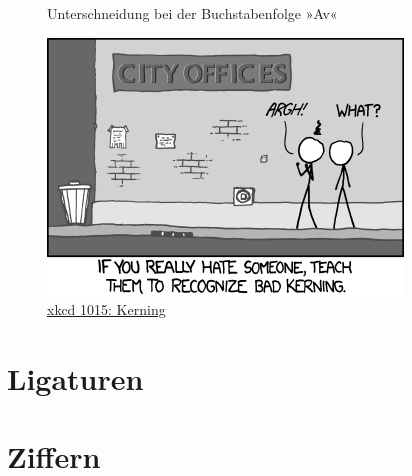 \begin{figure}
  \centering


  \caption{Unterschneidung bei der Buchstabenfolge »Av«}
  \label{fig:Unterschneidung}
\end{figure}

\begin{figure}
  \centering
  \includegraphics[width=.5\textwidth]{xkcd_Kerning}
  \caption{\href{http://xkcd.com/1015/}{xkcd 1015: Kerning}\protect\footnotemark}
  \label{fig:xkcd_kerning}
\end{figure}

\section{Ligaturen}



\section{Ziffern}
\label{sec:Ziffern}


